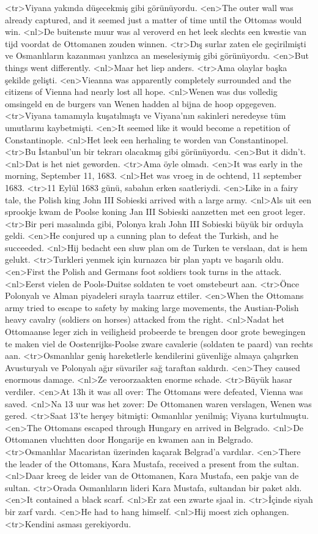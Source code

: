 <tr>Viyana yakında düşecekmiş gibi görünüyordu.
<en>The outer wall was already captured, and it seemed just a matter of time until the Ottomas would win.
<nl>De buitenste muur was al veroverd en het leek slechts een kwestie van tijd voordat de Ottomanen zouden winnen.  
<tr>Dış surlar zaten ele geçirilmişti ve Osmanlıların kazanması yanlızca an meselesiymiş gibi görünüyordu.
<en>But things went differently.
<nl>Maar het liep anders.
<tr>Ama olaylar başka şekilde gelişti.
<en>Vieanna was apparently completely surrounded and the citizens of Vienna had nearly lost all hope.
<nl>Wenen was dus volledig omsingeld en de burgers van Wenen hadden al bijna de hoop opgegeven. 
<tr>Viyana tamamıyla kuşatılmıştı ve Viyana'nın sakinleri neredeyse tüm umutlarını kaybetmişti.
<en>It seemed like it would become a repetition of Constantinople.
<nl>Het leek een herhaling te worden van Constantinopel. 
<tr>Bu İstanbul'un bir tekrarı olacakmış gibi görünüyordu.
<en>But it didn't.
<nl>Dat is het niet geworden.
<tr>Ama öyle olmadı.
<en>It was early in the morning, September 11, 1683.
<nl>Het was vroeg in de ochtend, 11 september 1683. 
<tr>11 Eylül 1683 günü, sabahın erken saatleriydi.
<en>Like in a fairy tale, the Polish king John III Sobieski arrived with a large army.
<nl>Als uit een sprookje kwam de Poolse koning Jan III Sobieski aanzetten met een groot leger. 
<tr>Bir peri masalında gibi, Polonya kralı John III Sobieski büyük bir orduyla geldi. 
<en>He conjured up a cunning plan to defeat the Turkish, and he succeeded.
<nl>Hij bedacht een sluw plan om de Turken te verslaan, dat is hem gelukt. 
<tr>Turkleri yenmek için kurnazca bir plan yaptı ve başarılı oldu.
<en>First the Polish and Germans foot soldiers took turns in the attack.
<nl>Eerst vielen de Pools-Duitse soldaten te voet omstebeurt aan. 
<tr>Önce Polonyalı ve Alman piyadeleri sırayla taarruz ettiler.
<en>When the Ottomans army tried to escape to safety by making large movements, the Austian-Polish heavy cavalry (soldiers on horses) attacked from the right.
<nl>Nadat het Ottomaanse leger zich in veiligheid probeerde te brengen door grote bewegingen te maken viel de Oostenrijks-Poolse zware cavalerie (soldaten te paard) van rechts aan. 
<tr>Osmanlılar geniş hareketlerle kendilerini güvenliğe almaya çalışırken Avusturyalı ve Polonyalı ağır süvariler sağ taraftan saldırdı. 
<en>They caused enormous damage. 
<nl>Ze veroorzaakten enorme schade.
<tr>Büyük hasar verdiler.
<en>At 13h it was all over: The Ottomans were defeated, Vienna was saved.
<nl>Na 13 uur was het zover: De Ottomanen waren verslagen, Wenen was gered. 
<tr>Saat 13'te herşey bitmişti: Osmanlılar yenilmiş; Viyana kurtulmuştu.
<en>The Ottomans escaped through Hungary en arrived in Belgrado.
<nl>De Ottomanen vluchtten door Hongarije en kwamen aan in Belgrado. 
<tr>Osmanlılar Macaristan üzerinden kaçarak Belgrad'a vardılar.
<en>There the leader of the Ottomans, Kara Mustafa, received a present from the sultan.
<nl>Daar kreeg de leider van de Ottomanen, Kara Mustafa, een pakje van de sultan. 
<tr>Orada Osmanlıların lideri Kara Mustafa, sultandan bir paket aldı.
<en>It contained a black scarf.
<nl>Er zat een zwarte sjaal in.
<tr>İçinde siyah bir zarf vardı.
<en>He had to hang himself.
<nl>Hij moest zich ophangen.
<tr>Kendini asması gerekiyordu.
